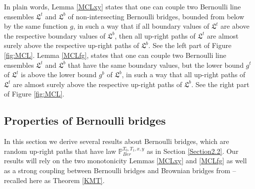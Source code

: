 In plain words, Lemma \ref{MCLxy} states that one can couple two Bernoulli line ensembles $\mathfrak{L}^{t}$ and $\mathfrak{L}^{b}$ of non-intersecting Bernoulli bridges, bounded from below by the same function $g$, in such a way that if all boundary values of $\mathfrak{L}^{t}$ are above the respective boundary values of $\mathfrak{L}^{b}$, then all up-right paths of $\mathfrak{L}^{t}$ are almost surely above the respective up-right paths of $\mathfrak{L}^{b}$. See the left part of Figure \ref{fig:MCL}. Lemma \ref{MCLfg}, states that one can couple two Bernoulli line ensembles $\mathfrak{L}^{t}$ and $\mathfrak{L}^{b}$ that have the same boundary values, but the lower bound $g^t$ of $\mathfrak{L}^{t}$ is above the lower bound $g^b$ of $\mathfrak{L}^{b}$, in such a way that all up-right paths of $\mathfrak{L}^{t}$ are almost surely above the respective up-right paths of $\mathfrak{L}^{b}$. See the right part of Figure \ref{fig:MCL}.


%
\subsection{Properties of Bernoulli bridges}\label{Section3.2} In this section we derive several results about Bernoulli bridges, which are random up-right paths that have law $\mathbb{P}_{Ber}^{T_0, T_1, x,y}$ as in Section \ref{Section2.2}. Our results will rely on the two monotonicity Lemmas \ref{MCLxy} and \ref{MCLfg} as well as a strong coupling between Bernoulli bridges and Brownian bridges from \cite{CD} -- recalled here as Theorem \ref{KMT}.

